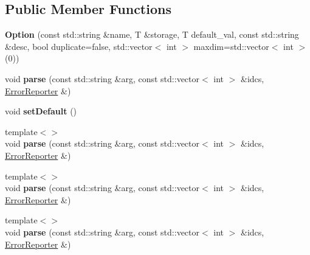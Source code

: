 \subsection*{Public Member Functions}
\begin{DoxyCompactItemize}
\item 
\mbox{\label{structdf_1_1program__options__lite_1_1_option_a4663cc930a0cf449dab82a8416e68a1d}} 
{\bfseries Option} (const std\+::string \&name, T \&storage, T default\+\_\+val, const std\+::string \&desc, bool duplicate=false, std\+::vector$<$ int $>$ maxdim=std\+::vector$<$ int $>$(0))
\item 
\mbox{\label{structdf_1_1program__options__lite_1_1_option_ae20d45acd9abcf807f6ce2905698d9ce}} 
void {\bfseries parse} (const std\+::string \&arg, const std\+::vector$<$ int $>$ \&idcs, \hyperlink{structdf_1_1program__options__lite_1_1_error_reporter}{Error\+Reporter} \&)
\item 
\mbox{\label{structdf_1_1program__options__lite_1_1_option_a07eb5c13acbe8d77db2b8bca02ae593f}} 
void {\bfseries set\+Default} ()
\item 
\mbox{\label{structdf_1_1program__options__lite_1_1_option_a69d718b5fc14b208eb7df3ca2ca21981}} 
{\footnotesize template$<$$>$ }\\void {\bfseries parse} (const std\+::string \&arg, const std\+::vector$<$ int $>$ \&idcs, \hyperlink{structdf_1_1program__options__lite_1_1_error_reporter}{Error\+Reporter} \&)
\item 
\mbox{\label{structdf_1_1program__options__lite_1_1_option_a99a149001618b7c148b40fa3b3fbdd0e}} 
{\footnotesize template$<$$>$ }\\void {\bfseries parse} (const std\+::string \&arg, const std\+::vector$<$ int $>$ \&idcs, \hyperlink{structdf_1_1program__options__lite_1_1_error_reporter}{Error\+Reporter} \&)
\item 
\mbox{\label{structdf_1_1program__options__lite_1_1_option_ab486abce0890546b8bb1fb9f343a3d04}} 
{\footnotesize template$<$$>$ }\\void {\bfseries parse} (const std\+::string \&arg, const std\+::vector$<$ int $>$ \&idcs, \hyperlink{structdf_1_1program__options__lite_1_1_error_reporter}{Error\+Reporter} \&)

\end{DoxyCompactItemize}
